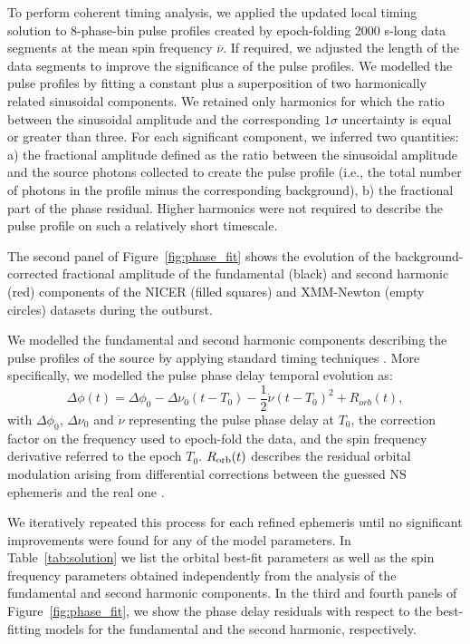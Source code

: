 \documentclass[fleqn,usenatbib]{mnras}
\newcommand{\nicer}{NICER}
\newcommand{\xmm}{XMM-Newton}
\begin{document}
To perform coherent timing analysis, we applied the updated local timing solution to 8-phase-bin pulse profiles created by epoch-folding 2000 s-long data segments at the mean spin frequency $\overline{\nu}$. If required, we adjusted the length of the data segments to improve the significance of the pulse profiles. We modelled the pulse profiles by fitting a constant plus a superposition of two harmonically related sinusoidal components. We retained only harmonics for which the ratio between the sinusoidal amplitude and the corresponding $1\sigma$ uncertainty is equal or greater than three. For each significant component, we inferred two quantities: a) the fractional amplitude defined as the ratio between the sinusoidal amplitude and the source photons collected to create the pulse profile (i.e., the total number of photons in the profile minus the corresponding background), b) the fractional part of the phase residual. Higher harmonics were not required to describe the pulse profile on such a relatively short timescale. 

The second panel of Figure~\ref{fig:phase_fit} shows the evolution of the background-corrected fractional amplitude of the fundamental (black) and second harmonic (red) components of the \nicer{} (filled squares) and \xmm{} (empty circles) datasets during the outburst. 

We modelled the fundamental and second harmonic components describing the pulse profiles of the source by applying standard timing techniques \citep[see e.g.,][for more details]{Burderi:2007tl, Sanna:2018wh}. More specifically, we modelled the pulse phase delay temporal evolution as:
\begin{equation}
\label{eq:fit_phase}
\Delta \phi(t)= \Delta \phi_0 - \Delta \nu_0(t-T_0)- \frac{1}{2} \dot{\nu}(t-T_0)^2+R_{orb}(t),
\end{equation}
with $\Delta \phi_0$, $\Delta \nu_0$ and $\dot{\nu}$ representing the pulse phase delay at $T_0$, the correction factor on the frequency used to epoch-fold the data, and the spin frequency derivative referred to the epoch $T_0$. $R_{\rm orb}(t)$ describes the residual orbital modulation arising from differential corrections between the guessed NS ephemeris and the real one \citep[see e.g.,][]{Deeter:1981te}.

We iteratively repeated this process for each refined ephemeris until no significant improvements were found for any of the model parameters. In Table~\ref{tab:solution} we list the orbital best-fit parameters as well as the spin frequency parameters obtained independently from the analysis of the fundamental and second harmonic components. In the third and fourth panels of Figure~\ref{fig:phase_fit}, we show the phase delay residuals with respect to the best-fitting models for the fundamental and the second harmonic, respectively. 
\end{document}
